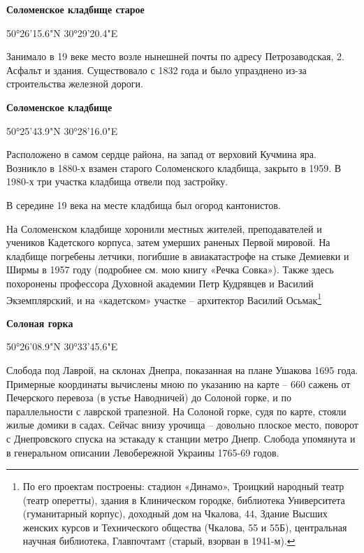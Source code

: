 \medskip

\textbf{Соломенское кладбище старое}

50°26'15.6"N 30°29'20.4"E

Занимало в 19 веке место возле нынешней почты по адресу Петрозаводская, 2. Асфальт и здания. Существовало с 1832 года и было упразднено из-за строительства железной дороги.\\

\medskip

\textbf{Соломенское кладбище}

50°25'43.9"N 30°28'16.0"E

Расположено в самом сердце района, на запад от верховий Кучмина яра. Возникло в 1880-х взамен старого Соломенского кладбища, закрыто в 1959. В 1980-х три участка кладбища отвели под застройку.

В середине 19 века на месте кладбища был огород кантонистов.

На Соломенском кладбище хоронили местных жителей, преподавателей и учеников Кадетского корпуса, затем умерших раненых Первой мировой. На кладбище погребены летчики, погибшие в авиакатастрофе на стыке Демиевки и Ширмы в 1957 году (подробнее см. мою книгу «Речка Совка»). Также здесь похоронены профессора Духовной академии Петр Кудрявцев и Василий Экземплярский, и на «кадетском» участке – архитектор Василий Осьмак\footnote{По его проектам построены: стадион «Динамо», Троицкий народный театр (театр оперетты), здания в Клиническом городке, библиотека Университета (гуманитарный корпус), доходный дом на Чкалова, 44, Здание Высших женских курсов и Технического общества (Чкалова, 55 и 55Б), центральная научная библиотека, Главпочтамт (старый, взорван в 1941-м).}\\

\medskip

\textbf{Солоная горка} 

50°26'08.9"N 30°33'45.6"E

Слобода под Лаврой, на склонах Днепра, показанная на плане Ушакова 1695 года. Примерные координаты вычислены мною по указанию на карте – 660 сажень от Печерского перевоза (в устье Наводничей) до Солоной горке, и по параллельности с лаврской трапезной. На Солоной горке, судя по карте, стояли жилые домики в садах. Сейчас внизу урочища – довольно плоское место, поворот с Днепровского спуска на эстакаду к станции метро Днепр. Слобода упомянута и в генеральном описании Левобережной Украины 1765-69 годов.\\

\medskip

